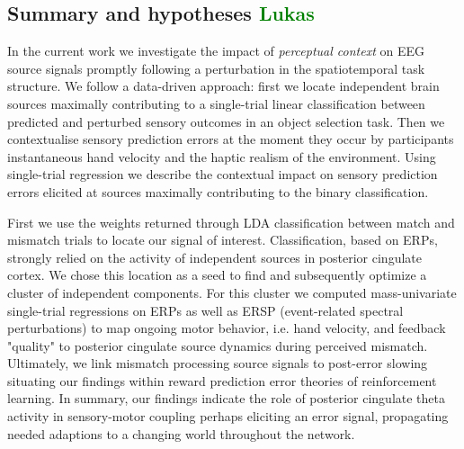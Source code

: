 \subsection{Summary and hypotheses \textcolor{green}{Lukas}}
In the current work we investigate the impact of \textit{perceptual context} on EEG source signals promptly following a perturbation in the spatiotemporal task structure. We follow a data-driven approach: first we locate independent brain sources maximally contributing to a single-trial linear classification between predicted and perturbed sensory outcomes in an object selection task. Then we contextualise sensory prediction errors at the moment they occur by participants instantaneous hand velocity and the haptic realism of the environment. Using single-trial regression we describe the contextual impact on sensory prediction errors elicited at sources maximally contributing to the binary classification.

First we use the weights returned through LDA classification between match and mismatch trials to locate our signal of interest. Classification, based on ERPs, strongly relied on the activity of independent sources in posterior cingulate cortex. We chose this location as a seed to find and subsequently optimize a cluster of independent components. For this cluster we computed mass-univariate single-trial regressions on ERPs as well as ERSP (event-related spectral perturbations) to map ongoing motor behavior, i.e. hand velocity, and feedback "quality" to posterior cingulate source dynamics during perceived mismatch. Ultimately, we link mismatch processing source signals to post-error slowing situating our findings within reward prediction error theories of reinforcement learning. In summary, our findings indicate the role of posterior cingulate theta activity in sensory-motor coupling perhaps eliciting an error signal, propagating needed adaptions to a changing world throughout the network.

